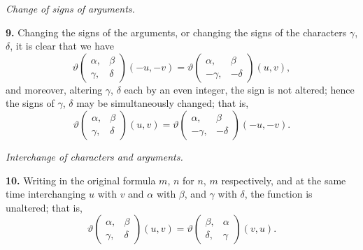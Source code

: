 \documentclass[11pt,a4paper]{book}
\begin{document}
\vspace{1em}

\begin{center}
\textit{Change of signs of arguments.}
\end{center}

\vspace{0.5em}

\noindent\textbf{9.}\quad
Changing the signs of the arguments, or changing the signs of the characters $\gamma$, $\delta$, it is clear that we have
\[
\vartheta\begin{pmatrix} \alpha, & \beta \\ \gamma, & \delta \end{pmatrix}(-u, -v) = \vartheta\begin{pmatrix} \alpha, & \beta \\ -\gamma, & -\delta \end{pmatrix}(u, v),
\]
and moreover, altering $\gamma$, $\delta$ each by an even integer, the sign is not altered; hence the signs of $\gamma$, $\delta$ may be simultaneously changed; that is,
\[
\vartheta\begin{pmatrix} \alpha, & \beta \\ \gamma, & \delta \end{pmatrix}(u, v) = \vartheta\begin{pmatrix} \alpha, & \beta \\ -\gamma, & -\delta \end{pmatrix}(-u, -v).
\]

\vspace{1em}

\begin{center}
\textit{Interchange of characters and arguments.}
\end{center}

\vspace{0.5em}

\noindent\textbf{10.}\quad
Writing in the original formula $m$, $n$ for $n$, $m$ respectively, and at the same time interchanging $u$ with $v$ and $\alpha$ with $\beta$, and $\gamma$ with $\delta$, the function is unaltered; that is,
\[
\vartheta\begin{pmatrix} \alpha, & \beta \\ \gamma, & \delta \end{pmatrix}(u, v) = \vartheta\begin{pmatrix} \beta, & \alpha \\ \delta, & \gamma \end{pmatrix}(v, u).
\]
\end{document}
